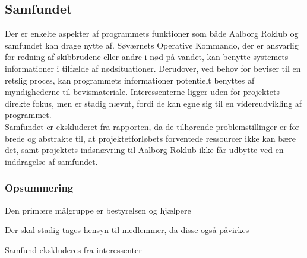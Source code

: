 \subsection*{Samfundet}
Der er enkelte aspekter af programmets funktioner som både Aalborg Roklub og samfundet kan drage nytte af. Søværnets Operative Kommando, der er ansvarlig for redning af skibbrudene eller andre i nød på vandet, kan benytte systemets informationer i tilfælde af nødsituationer. Derudover, ved behov for beviser til en retslig proces, kan programmets informationer potentielt benyttes af myndighederne til bevismateriale. Interessenterne ligger uden for projektets direkte fokus, men er stadig nævnt, fordi de kan egne sig til en videreudvikling af programmet.\\

Samfundet er ekskluderet fra rapporten, da de tilhørende problemstillinger er for brede og abstrakte til, at projektetforløbets forventede ressourcer ikke kan bære det, samt projektets indsnævring til Aalborg Roklub ikke får udbytte ved en inddragelse af samfundet. 

\subsubsection*{Opsummering}

\begin{itemize_small}
    \item Den primære målgruppe er bestyrelsen og hjælpere
    \item Der skal stadig tages hensyn til medlemmer, da disse også påvirkes
    \item Samfund ekskluderes fra interessenter
\end{itemize_small}


